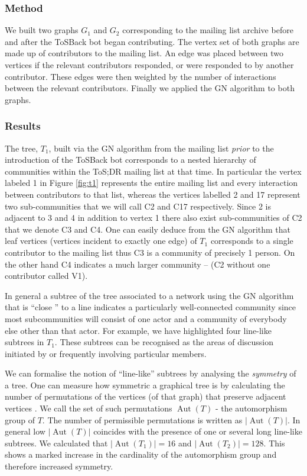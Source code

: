 \documentclass{sig-alternate}
\DeclareMathOperator{\Aut}{Aut}
\begin{document}
\subsubsection{Method}

We built two graphs $G_{1}$ and $G_2$ corresponding to the mailing list archive before and after the ToSBack bot began contributing. The vertex set of both graphs are made up of contributors to the mailing list. An edge was placed between two vertices if the relevant contributors responded, or were responded to by another contributor. These edges were then weighted by the number of interactions between the relevant contributors. Finally we applied the GN algorithm to both graphs.


\subsubsection{Results}

The tree, $T_1$, built via the GN algorithm from the mailing list \emph{prior} to the introduction of the  ToSBack bot corresponds to a nested hierarchy of communities within the ToS;DR mailing list at that time. In particular the vertex labeled 1 in Figure \ref{fig:t1} represents the entire mailing list and every interaction between contributors to that list, whereas the vertices labelled 2 and 17 represent two sub-communities that we will call C2 and C17 respectively. Since 2 is adjacent to 3 and 4 in addition to vertex 1 there also exist sub-communities of C2 that we denote C3 and C4. One can easily deduce from the GN algorithm that leaf vertices (vertices incident to exactly one edge) of $T_1$ corresponds to a single contributor to the mailing list thus C3 is a community of precisely 1 person. On the other hand C4 indicates a much larger community – (C2 without one contributor called V1).


In general a subtree of the tree associated to a network using the GN algorithm that is “close ” to a line indicates a particularly well-connected community since most subcommunities will consist of one actor and a community of everybody else other than that actor. For example, we have highlighted four line-like subtrees in $T_1$. These subtrees can be recognised as the areas of discussion initiated by or frequently involving particular members.

We can formalise the notion of “line-like” subtrees by analysing the \emph{symmetry} of  
a tree.  One can measure how symmetric
a graphical tree is by calculating the number of permutations of the
vertices (of that graph) that preserve adjacent vertices \cite{bela:mgt}. We
call the set of such permutations $\Aut(T)$ - the automorphism group of $T$.  The number of permissible permutations is written as 
$\lvert \Aut(T) \rvert$. In general low $\lvert \Aut(T) \rvert$ coincides with the presence of one or several long line-like subtrees.  We calculated that $\lvert \Aut(T_1)\rvert = 16$ and $\vert \Aut(T_2)\rvert = 128$.  This shows a marked
increase in the cardinality of the automorphism group and
therefore increased symmetry.
\end{document}
